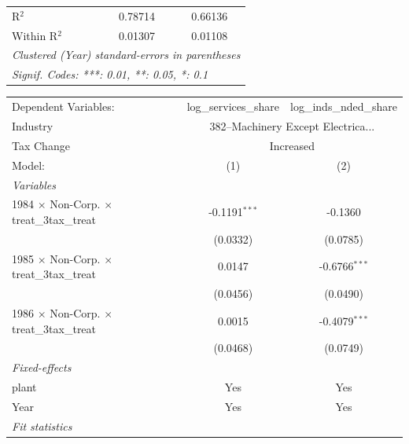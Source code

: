 \documentclass[
  12pt]{article}
\theoremstyle{definition}
\theoremstyle{remark}
\begin{document}
\begin{table}
\begin{minipage}{\linewidth}
\begin{tabular}{lcc}
   R$^2$                                                   & 0.78714                & 0.66136\\  
   Within R$^2$                                            & 0.01307                & 0.01108\\  
   \midrule \midrule
   \multicolumn{3}{l}{\emph{Clustered (Year) standard-errors in parentheses}}\\
   \multicolumn{3}{l}{\emph{Signif. Codes: ***: 0.01, **: 0.05, *: 0.1}}\\
\end{tabular}
\par\endgroup
\begingroup
\centering
\begin{tabular}{lcc}
   \tabularnewline \midrule \midrule
   Dependent Variables:                                    & log\_services\_share   & log\_inds\_nded\_share\\     
   Industry & \multicolumn{2}{c}{382–Machinery Except Electrica...} \\ 
   Tax Change & \multicolumn{2}{c}{Increased} \\ 
   Model:                                                  & (1)                    & (2)\\  
   \midrule
   \emph{Variables}\\
   1984 $\times$ Non-Corp. $\times$ treat\_3tax\_treat     & -0.1191$^{***}$        & -0.1360\\   
                                                           & (0.0332)               & (0.0785)\\   
   1985 $\times$ Non-Corp. $\times$ treat\_3tax\_treat     & 0.0147                 & -0.6766$^{***}$\\   
                                                           & (0.0456)               & (0.0490)\\   
   1986 $\times$ Non-Corp. $\times$ treat\_3tax\_treat     & 0.0015                 & -0.4079$^{***}$\\   
                                                           & (0.0468)               & (0.0749)\\   
   \midrule
   \emph{Fixed-effects}\\
   plant                                                   & Yes                    & Yes\\  
   Year                                                    & Yes                    & Yes\\  
   \midrule
   \emph{Fit statistics}\\

\end{tabular}
\end{minipage}
\end{table}
\end{document}
